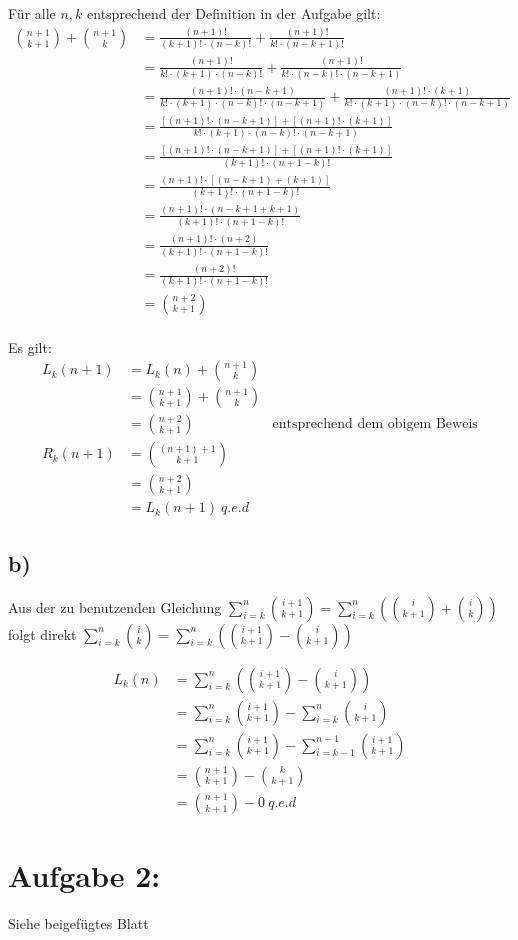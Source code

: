 \documentclass[a4paper,12pt,leqno]{scrartcl}
\begin{document}
Für alle $n, k$ entsprechend der Definition in der Aufgabe gilt:{\allowdisplaybreaks
\begin{align*}
\binom{n+1}{k+1} + \binom{n+1}{k} &= \frac{(n+1)!}{(k+1)!\cdot (n-k)!} + \frac{(n+1)!}{k!\cdot (n-k+1)!}\\
&= \frac{(n+1)!}{k!\cdot (k+1) \cdot (n-k)!} + \frac{(n+1)!}{k!\cdot (n-k)!\cdot (n-k+1)}\\
&= \frac{(n+1)!\cdot (n-k+1)}{k!\cdot (k+1) \cdot (n-k)!\cdot (n-k+1)} + \frac{(n+1)!\cdot (k+1)}{k!\cdot (k+1)\cdot (n-k)!\cdot (n-k+1)}\\
&= \frac{[(n+1)!\cdot (n-k+1)]+[(n+1)!\cdot (k+1)]}{k!\cdot (k+1) \cdot (n-k)!\cdot (n-k+1)}\\
&= \frac{[(n+1)!\cdot (n-k+1)]+[(n+1)!\cdot (k+1)]}{(k+1)! \cdot (n+1-k)!}\\
&= \frac{(n+1)!\cdot[(n-k+1)+(k+1)]}{(k+1)! \cdot (n+1-k)!}\\
&= \frac{(n+1)!\cdot(n-k+1+k+1)}{(k+1)! \cdot (n+1-k)!}\\
&= \frac{(n+1)!\cdot(n+2)}{(k+1)! \cdot (n+1-k)!}\\
&= \frac{(n+2)!}{(k+1)! \cdot (n+1-k)!}\\
&= \binom{n+2}{k+1}\\
\end{align*}
}

Es gilt:
\begin{align*}
L_k(n+1) &= L_k(n) + \binom{n+1}{k}\\
&= \binom{n+1}{k+1} + \binom{n+1}{k}\\
&= \binom{n+2}{k+1} & \text{entsprechend dem obigem Beweis}\\
R_k(n+1) &= \binom{(n+1)+1}{k+1}\\
&= \binom{n+2}{k+1}\\
&= L_k(n+1)\ q.e.d
\end{align*}

\subsection*{b)}

Aus der zu benutzenden Gleichung $\sum_{i=k}^n \binom{i+1}{k+1} = \sum_{i=k}^n (\binom{i}{k+1}+\binom{i}{k})$ folgt direkt $\sum_{i=k}^n \binom{i}{k} = \sum_{i=k}^n (\binom{i+1}{k+1}-\binom{i}{k+1})$

\begin{align*}
 L_k(n) &= \sum_{i=k}^n (\binom{i+1}{k+1}-\binom{i}{k+1})\\ %
 &= \sum_{i=k}^n \binom{i+1}{k+1} - \sum_{i=k}^n \binom{i}{k+1}\\ %
 &= \sum_{i=k}^n \binom{i+1}{k+1} - \sum_{i=k-1}^{n-1} \binom{i+1}{k+1}\\ %
 &= \binom{n+1}{k+1} - \binom{k}{k+1}\\
 &= \binom{n+1}{k+1} - 0\ q.e.d
\end{align*}


\section*{Aufgabe 2:}
Siehe beigefügtes Blatt
\end{document}
